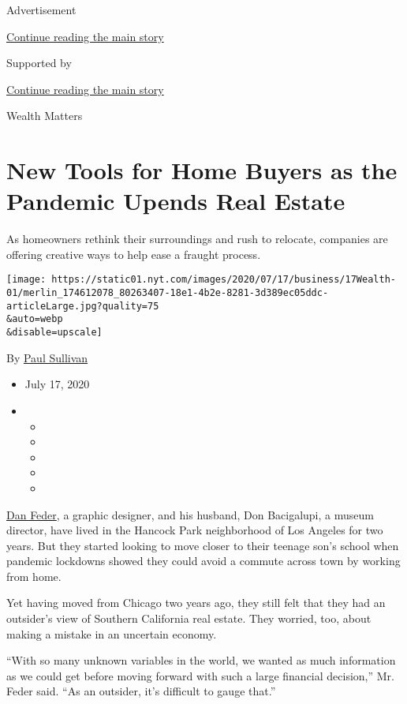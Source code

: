 Advertisement

\protect\hyperlink{after-top}{Continue reading the main story}

Supported by

\protect\hyperlink{after-sponsor}{Continue reading the main story}

Wealth Matters

\hypertarget{new-tools-for-home-buyers-as-the-pandemic-upends-real-estate}{%
\section{New Tools for Home Buyers as the Pandemic Upends Real
Estate}\label{new-tools-for-home-buyers-as-the-pandemic-upends-real-estate}}

As homeowners rethink their surroundings and rush to relocate, companies
are offering creative ways to help ease a fraught process.

\texttt{[image: https://static01.nyt.com/images/2020/07/17/business/17Wealth-01/merlin\_174612078\_80263407-18e1-4b2e-8281-3d389ec05ddc-articleLarge.jpg?quality=75\\\&auto=webp\\\&disable=upscale]}

By \href{https://www.nytimes.com/by/paul-sullivan}{Paul Sullivan}

\begin{itemize}
\item
  July 17, 2020
\item
  \begin{itemize}
  \item
  \item
  \item
  \item
  \item
  \end{itemize}
\end{itemize}

\href{https://tmagazine.blogs.nytimes.com/2012/03/27/a-bold-move/}{Dan
Feder}, a graphic designer, and his husband, Don Bacigalupi, a museum
director, have lived in the Hancock Park neighborhood of Los Angeles for
two years. But they started looking to move closer to their teenage
son's school when pandemic lockdowns showed they could avoid a commute
across town by working from home.

Yet having moved from Chicago two years ago, they still felt that they
had an outsider's view of Southern California real estate. They worried,
too, about making a mistake in an uncertain economy.

``With so many unknown variables in the world, we wanted as much
information as we could get before moving forward with such a large
financial decision,'' Mr. Feder said. ``As an outsider, it's difficult
to gauge that.''

